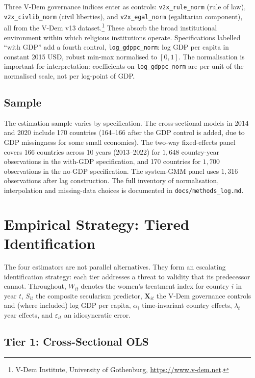 \documentclass[12pt,a4paper]{article}
\begin{document}
Three V-Dem governance indices enter as controls: \texttt{v2x\_rule\_norm} (rule of law), \texttt{v2x\_civlib\_norm} (civil liberties), and \texttt{v2x\_egal\_norm} (egalitarian component), all from the V-Dem v13 dataset.\footnote{V-Dem Institute, University of Gothenburg, \url{https://www.v-dem.net}.} These absorb the broad institutional environment within which religious institutions operate. Specifications labelled ``with GDP'' add a fourth control, \texttt{log\_gdppc\_norm}: log GDP per capita in constant 2015 USD, robust min-max normalised to $[0, 1]$. The normalisation is important for interpretation: coefficients on \texttt{log\_gdppc\_norm} are per unit of the normalised scale, not per log-point of GDP.

\subsection{Sample}

The estimation sample varies by specification. The cross-sectional models in 2014 and 2020 include 170 countries (164--166 after the GDP control is added, due to GDP missingness for some small economies). The two-way fixed-effects panel covers 166 countries across 10 years (2013--2022) for $1{,}648$ country-year observations in the with-GDP specification, and 170 countries for $1{,}700$ observations in the no-GDP specification. The system-GMM panel uses $1{,}316$ observations after lag construction. The full inventory of normalisation, interpolation and missing-data choices is documented in \texttt{docs/methods\_log.md}.

\section{Empirical Strategy: Tiered Identification}

The four estimators are not parallel alternatives. They form an escalating identification strategy: each tier addresses a threat to validity that its predecessor cannot. Throughout, $W_{it}$ denotes the women's treatment index for country $i$ in year $t$, $S_{it}$ the composite secularism predictor, $\mathbf{X}_{it}$ the V-Dem governance controls and (where included) log GDP per capita, $\alpha_i$ time-invariant country effects, $\lambda_t$ year effects, and $\varepsilon_{it}$ an idiosyncratic error.

\subsection{Tier 1: Cross-Sectional OLS}
\end{document}
